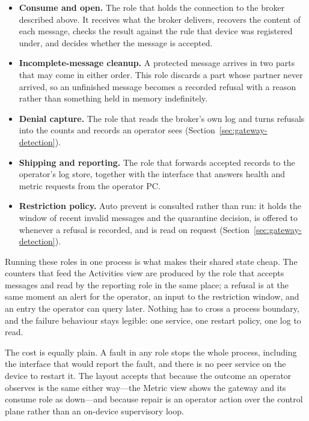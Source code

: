 \documentclass[12pt,a4paper]{report}
\begin{document}
\begin{itemize}
    \item \textbf{Consume and open.}
    The role that holds the connection to the broker described
    above. It receives what the broker delivers, recovers the
    content of each message, checks the result against the rule that
    device was registered under, and decides whether the message is
    accepted.
    \item \textbf{Incomplete-message cleanup.}
    A protected message arrives in two parts that may come in either
    order. This role discards a part whose partner never arrived, so
    an unfinished message becomes a recorded refusal with a reason
    rather than something held in memory indefinitely.
    \item \textbf{Denial capture.}
    The role that reads the broker's own log and turns refusals into
    the counts and records an operator sees
    (Section~\ref{sec:gateway-detection}).
    \item \textbf{Shipping and reporting.}
    The role that forwards accepted records to the operator's log
    store, together with the interface that answers health and
    metric requests from the operator PC.
    \item \textbf{Restriction policy.}
    Auto prevent is consulted rather than run: it holds the window
    of recent invalid messages and the quarantine decision, is
    offered to whenever a refusal is recorded, and is read on request
    (Section~\ref{sec:gateway-detection}).
\end{itemize}

Running these roles in one process is what makes their shared state
cheap. The counters that feed the Activities view are produced by
the role that accepts messages and read by the reporting role in the
same place; a refusal is at the same moment an alert for the
operator, an input to the restriction window, and an entry the
operator can query later. Nothing has to cross a process boundary,
and the failure behaviour stays legible: one service, one restart
policy, one log to read.

The cost is equally plain. A fault in any role stops the whole
process, including the interface that would report the fault, and
there is no peer service on the device to restart it. The layout
accepts that because the outcome an operator observes is the same
either way---the Metric view shows the gateway and its consume role
as down---and because repair is an operator action over the control
plane rather than an on-device supervisory loop.
\end{document}
